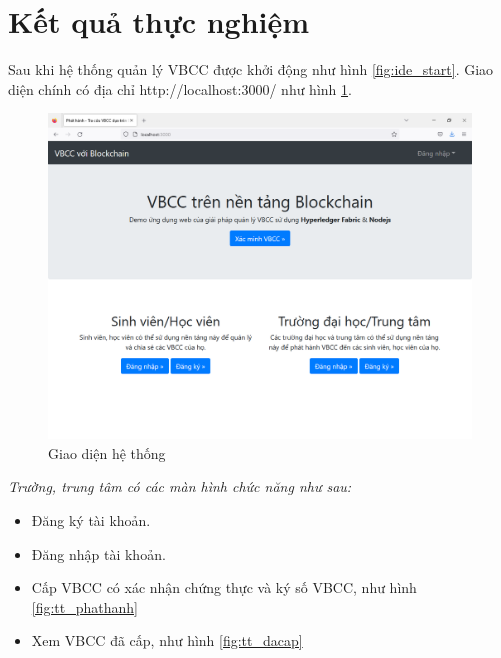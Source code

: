 \section{Kết quả thực nghiệm}

Sau khi hệ thống quản lý VBCC được khởi động như hình \ref{fig:ide_start}. Giao diện chính có địa chỉ http://localhost:3000/ như hình \ref{fig:main_vbcc}. 

\begin{figure}[htbp]
\centering
\includegraphics[width=.9\linewidth]{img/main_vbcc.png}
\caption{Giao diện hệ thống}
\label{fig:main_vbcc}
\end{figure}

\emph{Trường, trung tâm có các màn hình chức năng như sau:}

\begin{itemize}
\item Đăng ký tài khoản.

\item Đăng nhập tài khoản.

\item Cấp VBCC có xác nhận chứng thực và ký số VBCC, như hình \ref{fig:tt_phathanh}

\item Xem VBCC đã cấp, như hình \ref{fig:tt_dacap}

\end{itemize}

